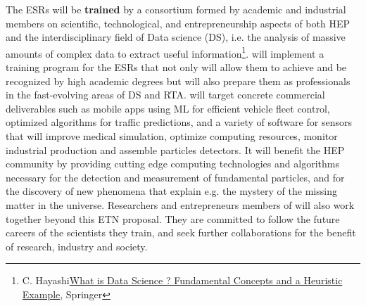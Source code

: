 The \acronym ESRs will be \textbf{trained} by a
consortium formed by academic and industrial
members on scientific, technological, and entrepreneurship
aspects of both HEP and the interdisciplinary field of Data science (DS), 
i.e. the analysis of massive amounts of complex data to extract
useful information\footnote{C. Hayashi\href{https://link.springer.com/chapter/10.1007/978-4-431-65950-1_3}{What is Data Science ? Fundamental Concepts and a Heuristic Example}, Springer}. 
\acronym will implement a training program for
the ESRs that not only will allow them to achieve and be recognized by
high academic degrees but will also prepare them as professionals
in the fast-evolving areas of DS and RTA.
\acronym will target concrete
commercial deliverables such as 
mobile apps using ML for efficient vehicle fleet control, 
optimized algorithms for traffic predictions,
and a variety of software for sensors that will improve medical simulation,
optimize computing resources,
monitor industrial production
and assemble particles detectors. 
It will benefit the HEP community by
providing cutting edge computing technologies and algorithms
necessary for the detection and measurement of fundamental particles,
and for the discovery of new phenomena that explain e.g. 
the mystery of the missing matter in the universe. 
Researchers and entrepreneurs members of \acronym 
will also work together beyond this ETN proposal. 
They are committed to follow the future careers of the 
scientists they train, and seek further collaborations
for the benefit of research, industry and society. 
